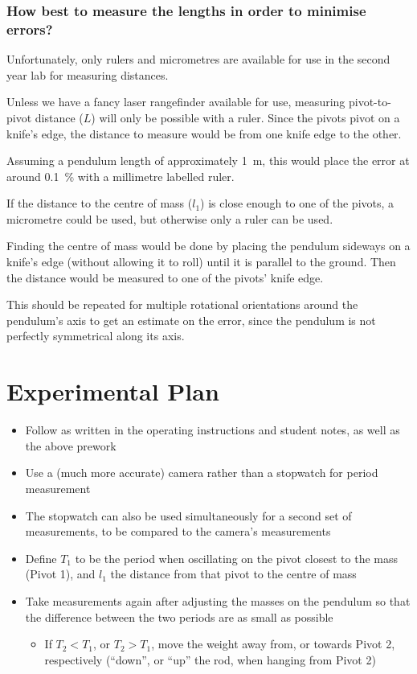 \documentclass[a4paper]{scrartcl}
\begin{document}
\subsubsection{How best to measure the lengths in order to minimise errors?}
Unfortunately, only rulers and micrometres are available for use in the second year lab for measuring distances.

Unless we have a fancy laser rangefinder available for use, measuring pivot-to-pivot distance (\(L\)) will only be possible with a ruler. Since the pivots pivot on a knife's edge, the distance to measure would be from one knife edge to the other.

Assuming a pendulum length of approximately \SI{1}{\metre}, this would place the error at around \SI{0.1}{\percent} with a millimetre labelled ruler.

If the distance to the centre of mass (\(l_1\)) is close enough to one of the pivots, a micrometre could be used, but otherwise only a ruler can be used.

Finding the centre of mass would be done by placing the pendulum sideways on a knife's edge (without allowing it to roll) until it is parallel to the ground. Then the distance would be measured to one of the pivots' knife edge.

This should be repeated for multiple rotational orientations around the pendulum's axis to get an estimate on the error, since the pendulum is not perfectly symmetrical along its axis.

\section{Experimental Plan}
\begin{itemize}
    \item Follow as written in the operating instructions and student notes, as well as the above prework
    \item Use a (much more accurate) camera rather than a stopwatch for period measurement
    \item The stopwatch can also be used simultaneously for a second set of measurements, to be compared to the camera's measurements
    \item Define \(T_1\) to be the period when oscillating on the pivot closest to the mass (Pivot 1), and \(l_1\) the distance from that pivot to the centre of mass
    \item Take measurements again after adjusting the masses on the pendulum so that the difference between the two periods are as small as possible
    \begin{itemize}
        \item If \(T_2 < T_1\), or \(T_2 > T_1\), move the weight away from, or towards Pivot 2, respectively (``down'', or ``up'' the rod, when hanging from Pivot 2)
    \end{itemize}
\end{itemize}
\end{document}
